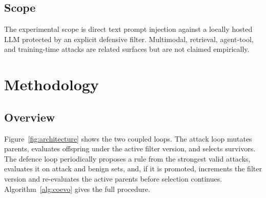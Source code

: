 \documentclass[preprint,12pt,authoryear]{elsarticle}
\begin{document}
\subsection{Scope}
The experimental scope is direct text prompt injection against a locally hosted LLM protected by an explicit defensive filter. Multimodal, retrieval, agent-tool, and training-time attacks are related surfaces but are not claimed empirically.

\section{Methodology}
\label{sec:method}

\subsection{Overview}
Figure~\ref{fig:architecture} shows the two coupled loops. The attack loop mutates parents, evaluates offspring under the active filter version, and selects survivors. The defence loop periodically proposes a rule from the strongest valid attacks, evaluates it on attack and benign sets, and, if it is promoted, increments the filter version and re-evaluates the active parents before selection continues. Algorithm~\ref{alg:coevo} gives the full procedure.
\end{document}
